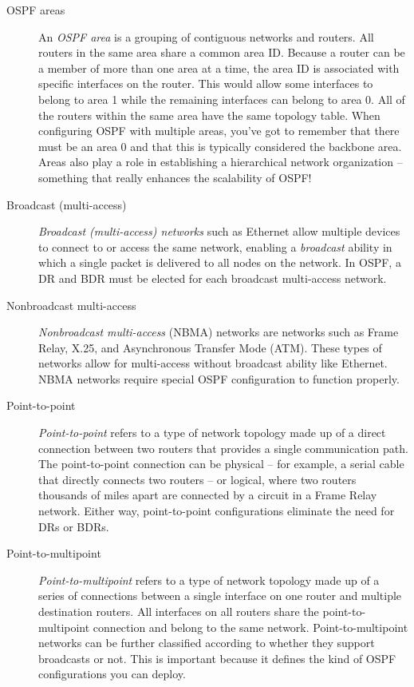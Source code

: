 \begin{description}
\item[OSPF areas]
   An \emph{OSPF area} is a grouping of contiguous networks and routers. All routers in the same area share a common area
ID. Because a router can be a member of more than one area at a time,
the area ID is associated with specific interfaces on the router. This
would allow some interfaces to belong to area 1 while the remaining
interfaces can belong to area 0. All of the routers within the same area
have the same topology table. When configuring OSPF with multiple areas,
you've got to remember that there must be an area 0 and that this is
typically considered the backbone area. Areas also play a role in
establishing a hierarchical network organization -- something that really
enhances the scalability of OSPF!

\item[Broadcast (multi-access)]
   \emph{Broadcast (multi-access) networks} such as Ethernet allow multiple devices to connect to or
access the same network, enabling a \emph{broadcast} ability in which a
single packet is delivered to all nodes on the network. In OSPF, a DR
and BDR must be elected for each broadcast multi-access network.

\item[Nonbroadcast multi-access]
   \emph{Nonbroadcast multi-access} (NBMA) networks are networks such as Frame Relay, X.25, and Asynchronous Transfer Mode (ATM).
   These types of networks allow for multi-access without broadcast ability like Ethernet.
   NBMA networks require special OSPF configuration to function properly.

\item[Point-to-point]
   \emph{Point-to-point} refers to a type of network topology made up of a
direct connection between two routers that provides a single
communication path. The point-to-point connection can be physical -- for
example, a serial cable that directly connects two routers -- or logical,
where two routers thousands of miles apart are connected by a circuit in
a Frame Relay network. Either way, point-to-point configurations
eliminate the need for DRs or BDRs.

\item[Point-to-multipoint]
\emph{Point-to-multipoint} refers to a type
of network topology made up of a series of connections between a single
interface on one router and multiple destination routers. All interfaces
on all routers share the point-to-multipoint connection and belong to
the same network. Point-to-multipoint networks can be further classified
according to whether they support broadcasts or not. This is important
because it defines the kind of OSPF configurations you can deploy.
\end{description}

